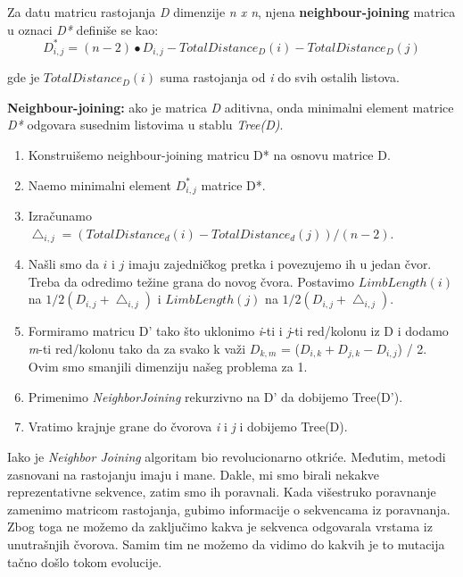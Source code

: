 Za datu matricu rastojanja \textit{D} dimenzije \textit{n x n}, njena \textbf{neighbour-joining} matrica u oznaci \textit{D*} defini\v{s}e se kao:\\

$$D^*_{i, j} = (n - 2) \bullet D_{i, j} - TotalDistance_D(i) - TotalDistance_D(j)$$


 gde je $TotalDistance_D(i)$ suma rastojanja od \textit{i} do svih ostalih listova.

\begin{teorema}
\textbf{Neighbour-joining:} ako je matrica \textit{D} aditivna, onda minimalni element matrice \textit{D*} odgovara susednim listovima u stablu \textit{Tree(D)}.
\end{teorema}

\begin{enumerate}
\item Konstrui\v{s}emo neighbour-joining matricu D* na osnovu matrice D.
\item Na\dj emo minimalni element $D^*_{i, j}$ matrice D*.
\item Izra\v{c}unamo $\bigtriangleup_{i, j} = (TotalDistance_d(i) - TotalDistance_d(j)) / (n - 2)$.
\item Našli smo da $i$ i $j$ imaju zajedničkog pretka i povezujemo ih u jedan čvor. Treba da odredimo težine grana do novog čvora. Postavimo $LimbLength(i)$ na $1/2(D_{i, j} + \bigtriangleup_{i, j})$ i $LimbLength(j)$ na $1/2(D_{i, j} + \bigtriangleup_{i, j})$.
\item Formiramo matricu D' tako \v{s}to uklonimo \textit{i}-ti i \textit{j}-ti red/kolonu iz D i dodamo \textit{m}-ti red/kolonu tako da za svako k va\v{z}i $D_{k, m}$ = ($D_{i, k} + D_{j, k} - D_{i, j}$) / 2. Ovim smo smanjili dimenziju našeg problema za 1.
\item Primenimo \textit{NeighborJoining} rekurzivno na D' da dobijemo Tree(D').
\item Vratimo krajnje grane do \v{c}vorova \textit{i} i \textit{j} i dobijemo Tree(D).
\end{enumerate}

Iako je \textit{Neighbor Joining} algoritam bio revolucionarno otkriće. Međutim, metodi zasnovani na rastojanju imaju i mane. Dakle, mi smo birali nekakve reprezentativne sekvence, zatim smo ih poravnali. Kada vi\v{s}estruko poravnanje zamenimo matricom rastojanja, gubimo informacije o sekvencama iz poravnanja. Zbog toga ne mo\v{z}emo da zaklju\v{c}imo kakva je sekvenca odgovarala vrstama iz unutra\v{s}njih \v{c}vorova. Samim tim ne možemo da vidimo do kakvih je to mutacija tačno došlo tokom evolucije.



